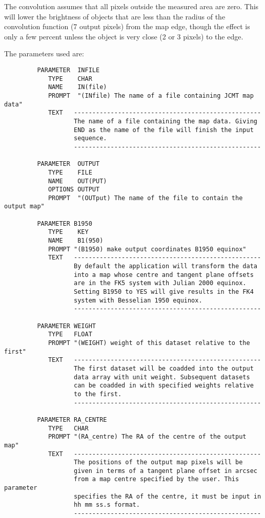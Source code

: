 \documentclass[twoside,11pt]{article}
\renewcommand{\_}{\texttt{\symbol{95}}}
\begin{document}
The convolution assumes that all pixels outside the measured  area are
zero. This will lower the brightness of objects that are  less than
the radius of the convolution function (7 output pixels)  from the map
edge, though the effect is only a few percent unless  the object is
very close (2 or 3 pixels) to the edge. 

\goodbreak

The parameters used are:

\begin{small}
\begin{verbatim}
         PARAMETER  INFILE
            TYPE    CHAR
            NAME    IN(file)
            PROMPT  "(INfile) The name of a file containing JCMT map data"
            TEXT   ---------------------------------------------------
                   The name of a file containing the map data. Giving
                   END as the name of the file will finish the input 
                   sequence.
                   ---------------------------------------------------

         PARAMETER  OUTPUT
            TYPE    FILE
            NAME    OUT(PUT)
            OPTIONS OUTPUT
            PROMPT  "(OUTput) The name of the file to contain the output map"

         PARAMETER B1950 
            TYPE    KEY 
            NAME    B1(950) 
            PROMPT "(B1950) make output coordinates B1950 equinox"
            TEXT   ---------------------------------------------------
                   By default the application will transform the data 
                   into a map whose centre and tangent plane offsets
                   are in the FK5 system with Julian 2000 equinox.
                   Setting B1950 to YES will give results in the FK4
                   system with Besselian 1950 equinox.
                   ---------------------------------------------------

         PARAMETER WEIGHT
            TYPE   FLOAT
            PROMPT "(WEIGHT) weight of this dataset relative to the first"
            TEXT   ---------------------------------------------------
                   The first dataset will be coadded into the output
                   data array with unit weight. Subsequent datasets
                   can be coadded in with specified weights relative
                   to the first.
                   ---------------------------------------------------

         PARAMETER RA_CENTRE
            TYPE   CHAR
            PROMPT "(RA_centre) The RA of the centre of the output map"
            TEXT   ---------------------------------------------------
                   The positions of the output map pixels will be 
                   given in terms of a tangent plane offset in arcsec 
                   from a map centre specified by the user. This parameter
                   specifies the RA of the centre, it must be input in 
                   hh mm ss.s format.
                   ---------------------------------------------------


\end{verbatim}
\end{small}
\end{document}
